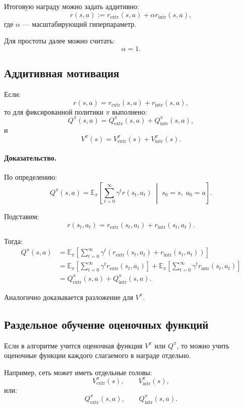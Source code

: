 \documentclass[12pt,a4paper]{article}
\begin{document}
Итоговую награду можно задать аддитивно:
\[
r(s,a)
:=
r_{\mathrm{extr}}(s,a)
+
\alpha r_{\mathrm{intr}}(s,a),
\]
где $\alpha$ --- масштабирующий гиперпараметр.

Для простоты далее можно считать:
\[
\alpha=1.
\]

\subsection{Аддитивная мотивация}

Если:
\[
r(s,a)
=
r_{\mathrm{extr}}(s,a)
+
r_{\mathrm{intr}}(s,a),
\]
то для фиксированной политики $\pi$ выполнено:
\[
Q^\pi(s,a)
=
Q^\pi_{\mathrm{extr}}(s,a)
+
Q^\pi_{\mathrm{intr}}(s,a),
\]
и
\[
V^\pi(s)
=
V^\pi_{\mathrm{extr}}(s)
+
V^\pi_{\mathrm{intr}}(s).
\]

\paragraph{Доказательство.}

По определению:
\[
Q^\pi(s,a)
=
\mathbb E_\pi
\left[
\sum_{t=0}^{\infty}
\gamma^t r(s_t,a_t)
\;\middle|\;
s_0=s,\;a_0=a
\right].
\]

Подставим:
\[
r(s_t,a_t)
=
r_{\mathrm{extr}}(s_t,a_t)
+
r_{\mathrm{intr}}(s_t,a_t).
\]

Тогда:
\[
\begin{aligned}
Q^\pi(s,a)
&=
\mathbb E_\pi
\left[
\sum_{t=0}^{\infty}
\gamma^t
\left(
r_{\mathrm{extr}}(s_t,a_t)
+
r_{\mathrm{intr}}(s_t,a_t)
\right)
\right]
\\
&=
\mathbb E_\pi
\left[
\sum_{t=0}^{\infty}
\gamma^t r_{\mathrm{extr}}(s_t,a_t)
\right]
+
\mathbb E_\pi
\left[
\sum_{t=0}^{\infty}
\gamma^t r_{\mathrm{intr}}(s_t,a_t)
\right]
\\
&=
Q^\pi_{\mathrm{extr}}(s,a)
+
Q^\pi_{\mathrm{intr}}(s,a).
\end{aligned}
\]

Аналогично доказывается разложение для $V^\pi$.

\subsection{Раздельное обучение оценочных функций}

Если в алгоритме учится оценочная функция $V^\pi$ или $Q^\pi$, то можно учить оценочные функции каждого слагаемого в награде отдельно.

Например, сеть может иметь отдельные головы:
\[
V^\pi_{\mathrm{extr}}(s),
\qquad
V^\pi_{\mathrm{intr}}(s),
\]
или:
\[
Q^\pi_{\mathrm{extr}}(s,a),
\qquad
Q^\pi_{\mathrm{intr}}(s,a).
\]
\end{document}

